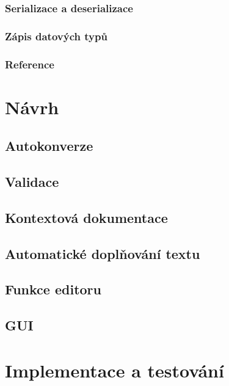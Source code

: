 \documentclass[FM,bw,DP]{tulthesis}
\begin{document}
\subsection{Serializace a deserializace}


\subsection{Zápis datových typů}


\subsection{Reference}


\chapter{Návrh}


\section{Autokonverze}

\section{Validace}

\section{Kontextová dokumentace}

\section{Automatické doplňování textu}

\section{Funkce editoru}

\section{GUI}


\chapter{Implementace a testování}
\end{document}
